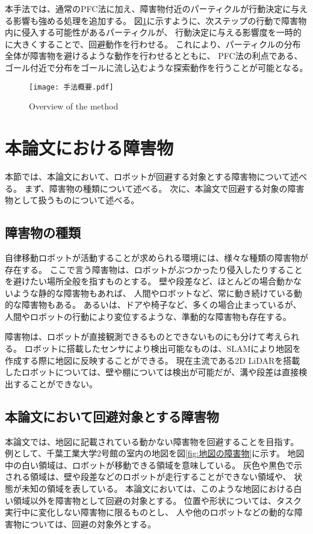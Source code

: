 本手法では、通常のPFC法に加え、障害物付近のパーティクルが行動決定に与える影響も強める処理を追加する。
図\ref{fig:手法概要}に示すように、次ステップの行動で障害物内に侵入する可能性があるパーティクルが、
行動決定に与える影響度を一時的に大きくすることで、回避動作を行わせる。
これにより、パーティクルの分布全体が障害物を避けるような動作を行わせるとともに、
PFC法の利点である、ゴール付近で分布をゴールに流し込むような探索動作を行うことが可能となる。

\begin{figure}[h]
  \begin{center}
    \texttt{[image: 手法概要.pdf]}
    \caption{Overview of the method}
    \label{fig:手法概要}
  \end{center}
\end{figure}


\section{本論文における障害物} \label{section:障害物}
本節では、本論文において、ロボットが回避する対象とする障害物について述べる。
まず、障害物の種類について述べる。
次に、本論文で回避する対象の障害物として扱うものについて述べる。

\subsection{障害物の種類}
自律移動ロボットが活動することが求められる環境には、様々な種類の障害物が存在する。
ここで言う障害物は、ロボットがぶつかったり侵入したりすることを避けたい場所全般を指すものとする。
壁や段差など、ほとんどの場合動かないような静的な障害物もあれば、
人間やロボットなど、常に動き続けている動的な障害物もある。
あるいは、ドアや椅子など、多くの場合止まっているが、人間やロボットの行動により変位するような、準動的な障害物も存在する。

障害物は、ロボットが直接観測できるものとできないものにも分けて考えられる。
ロボットに搭載したセンサにより検出可能なものは、SLAMにより地図を作成する際に地図に反映することができる。
現在主流である2D LiDARを搭載したロボットについては、壁や棚については検出が可能だが、溝や段差は直接検出することができない。

\subsection{本論文において回避対象とする障害物}
本論文では、地図に記載されている動かない障害物を回避することを目指す。
例として、千葉工業大学2号館の室内の地図を図\ref{fig:地図の障害物}に示す。
地図中の白い領域は、ロボットが移動できる領域を意味している。
灰色や黒色で示される領域は、壁や段差などのロボットが走行することができない領域や、
状態が未知の領域を表している。
本論文においては、このような地図における白い領域以外を障害物として回避の対象とする。
位置や形状については、タスク実行中に変化しない障害物に限るものとし、
人や他のロボットなどの動的な障害物については、回避の対象外とする。

